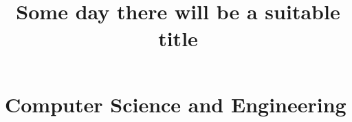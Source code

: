 \documentclass{report}
\title{Some day there will be a suitable title}
\begin{document}
\chapter{Computer Science and Engineering}

\end{document}
